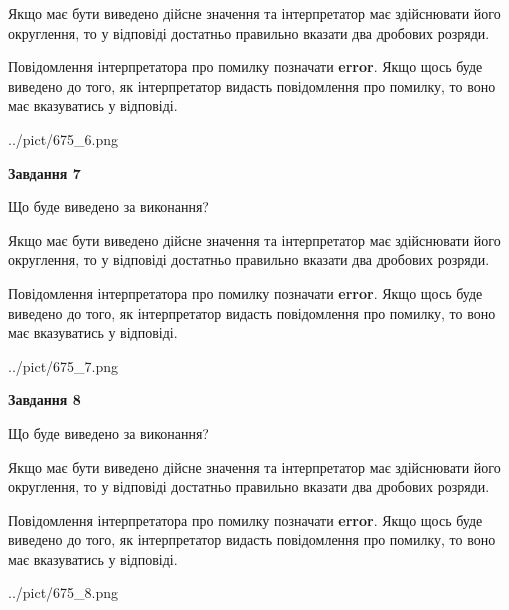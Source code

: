 \documentclass[12pt, ukrainian]{article}
\begin{document}
{\begin {Large}
Якщо має бути виведено дійсне значення та інтерпретатор має здійснювати його округлення, 
то у відповіді достатньо правильно вказати два дробових розряди.

Повідомлення інтерпретатора про помилку позначати \textbf{error}.
Якщо щось буде виведено до того, як інтерпретатор видасть повідомлення про помилку, 
то воно має вказуватись у відповіді. \par

\begin{center}
	{../pict/675_6.png}
\end{center}
\newpage

{\begin {center}\textbf{Завдання 7}\end {center}}\par
Що буде виведено за виконання? \par

Якщо має бути виведено дійсне значення та інтерпретатор має здійснювати його округлення, 
то у відповіді достатньо правильно вказати два дробових розряди.

Повідомлення інтерпретатора про помилку позначати \textbf{error}.
Якщо щось буде виведено до того, як інтерпретатор видасть повідомлення про помилку, 
то воно має вказуватись у відповіді. \par

\begin{center}
	{../pict/675_7.png}
\end{center}
\newpage

{\begin {center}\textbf{Завдання 8}\end {center}}\par
Що буде виведено за виконання? \par

Якщо має бути виведено дійсне значення та інтерпретатор має здійснювати його округлення, 
то у відповіді достатньо правильно вказати два дробових розряди.

Повідомлення інтерпретатора про помилку позначати \textbf{error}.
Якщо щось буде виведено до того, як інтерпретатор видасть повідомлення про помилку, 
то воно має вказуватись у відповіді. \par

\begin{center}
	{../pict/675_8.png}
\end{center}
\newpage


\end{Large}}
\end{document}
